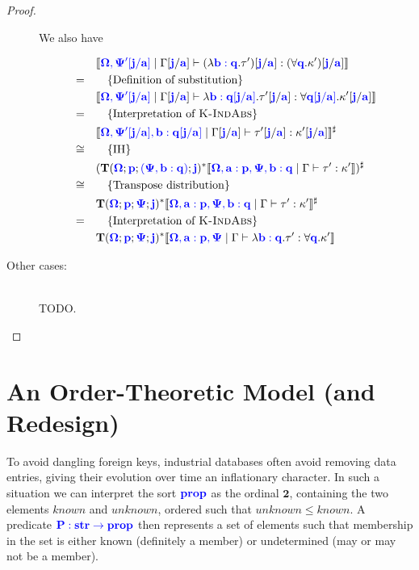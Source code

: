 \documentclass[sigplan,10pt,review,anonymous]{acmart}
\newcommand{\blum}[1]{\mathbf{\color{blue}{#1}}}
\newcommand{\sem}[1]{\llbracket #1 \rrbracket}
\newcommand{\mbf}[1]{\mathbf{#1}}
\begin{document}
\begin{proof}
\begin{description}
We also have

\begin{align*}
 &\quad \sem{\blum{\Omega, \Psi'[j/a]} \mid \Gamma[\blum{j}/\blum{a}] \vdash (\lambda \blum{b : q}. \tau')[\blum{j}/\blum{a}] : (\forall \blum{q}. \kappa')[\blum{j}/\blum{a}]}\\
=&\qquad \{ \text{Definition of substitution} \}\\
 &\quad \sem{\blum{\Omega, \Psi'[j/a]} \mid \Gamma[\blum{j}/\blum{a}] \vdash \lambda \blum{b : q[j/a]}. \tau'[\blum{j}/\blum{a}] : \forall \blum{q[j/a]}. \kappa'[\blum{j}/\blum{a}]}\\
=&\qquad \{ \text{Interpretation of \begin{sc}K-IndAbs\end{sc}} \} \\
 &\quad \sem{\blum{\Omega,\Psi'[j/a], b : q[j/a]} \mid \Gamma[\blum{j}/\blum{a}] \vdash \tau'[\blum{j}/\blum{a}] : \kappa'[\blum{j} / \blum{a}] }^\sharp\\
\cong&\qquad \{ \text{IH} \}\\
 &\quad (\mbf{T}(\blum{\Omega}; \blum{p} ; \blum{(\Psi, b:q)} ; \blum{j})^* \sem{\blum{\Omega, a : p, \Psi, b : q} \mid \Gamma \vdash \tau' : \kappa'})^\sharp\\
\cong&\qquad \{ \text{Transpose distribution} \} \\
 &\quad \mbf{T}(\blum{\Omega} ; \blum{p} ; \blum{\Psi} ; \blum{j})^*\sem{\blum{\Omega, a : p, \Psi, b : q} \mid \Gamma \vdash \tau' : \kappa'}^\sharp\\
=& \qquad \{ \text{Interpretation of \begin{sc}K-IndAbs\end{sc}} \}\\
 &\quad \mbf{T}(\blum{\Omega} ; \blum{p} ; \blum{\Psi} ; \blum{j})^*\sem{\blum{\Omega, a : p, \Psi} \mid \Gamma \vdash \lambda \blum{b : q}. \tau' : \forall \blum{q}. \kappa'}
\end{align*}

\item[Other cases:]~\\
TODO.
\end{description}

\end{proof}

\section{An Order-Theoretic Model (and Redesign)}

To avoid dangling foreign keys, industrial databases often avoid removing data entries, giving their evolution over time an inflationary character. In such a situation we can interpret the sort $\blum{prop}$ as the ordinal $\mbf{2}$, containing the two elements $\mathit{known}$ and $\mathit{unknown}$, ordered such that $\mathit{unknown} \leq \mathit{known}$. A predicate $\blum{P : str \to prop}$ then represents a set of elements such that membership in the set is either known (definitely a member) or undetermined (may or may not be a member).
\end{document}
